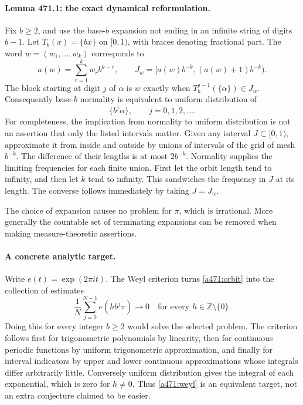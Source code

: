 \documentclass[11pt]{article}
\begin{document}
\paragraph{Lemma 471.1: the exact dynamical reformulation.}
Fix $b\geq2$, and use the base-$b$ expansion not ending in an infinite string of digits $b-1$. Let $T_b(x)=\{bx\}$ on $[0,1)$, with braces denoting fractional part. The word $w=(w_1,\ldots,w_k)$ corresponds to
\[
 a(w)=\sum_{r=1}^k w_r b^{k-r},\qquad
 J_w=[a(w)b^{-k},(a(w)+1)b^{-k}).
\]
The block starting at digit $j$ of $\alpha$ is $w$ exactly when $T_b^{j-1}(\{\alpha\})\in J_w$. Consequently base-$b$ normality is equivalent to uniform distribution of
\begin{equation}\label{a471:orbit}
                         \{b^j\alpha\},\qquad j=0,1,2,\ldots.
\end{equation}
For completeness, the implication from normality to uniform distribution is not an assertion that only the listed intervals matter. Given any interval $J\subset[0,1)$, approximate it from inside and outside by unions of intervals of the grid of mesh $b^{-k}$. The difference of their lengths is at most $2b^{-k}$. Normality supplies the limiting frequencies for each finite union. First let the orbit length tend to infinity, and then let $k$ tend to infinity. This sandwiches the frequency in $J$ at its length. The converse follows immediately by taking $J=J_w$.

The choice of expansion causes no problem for $\pi$, which is irrational. More generally the countable set of terminating expansions can be removed when making measure-theoretic assertions.

\paragraph{A concrete analytic target.}
Write $e(t)=\exp(2\pi i t)$. The Weyl criterion turns \eqref{a471:orbit} into the collection of estimates
\begin{equation}\label{a471:weyl}
              \frac1N\sum_{j=0}^{N-1}e(hb^j\pi)\longrightarrow0
              \quad\text{for every }h\in\mathbb Z\setminus\{0\}.
\end{equation}
Doing this for every integer $b\geq2$ would solve the selected problem. The criterion follows first for trigonometric polynomials by linearity, then for continuous periodic functions by uniform trigonometric approximation, and finally for interval indicators by upper and lower continuous approximations whose integrals differ arbitrarily little. Conversely uniform distribution gives the integral of each exponential, which is zero for $h\ne0$. Thus \eqref{a471:weyl} is an equivalent target, not an extra conjecture claimed to be easier.
\end{document}

